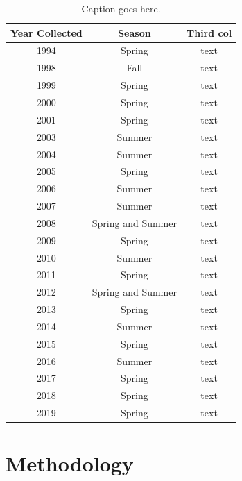 \documentclass[acmtog, authorversion]{acmart}
\begin{document}
\begin{table}
    \caption{Caption goes here.}
    \label{tab:avail}
    \begin{tabular}{c|c|c}
        \toprule
        Year Collected & Season & Third col\\
        \midrule
        1994 & Spring & text\\
        1998 & Fall & text\\
        1999 & Spring & text\\
        2000 & Spring & text\\
        2001 & Spring & text\\
        2003 & Summer & text\\
        2004 & Summer & text\\
        2005 & Spring & text\\
        2006 & Summer & text\\
        2007 & Summer & text\\
        2008 & Spring and Summer & text\\
        2009 & Spring & text\\
        2010 & Summer & text\\
        2011 & Spring & text\\
        2012 & Spring and Summer & text\\
        2013 & Spring & text\\
        2014 & Summer & text\\
        2015 & Spring & text\\
        2016 & Summer & text\\
        2017 & Spring & text\\
        2018 & Spring & text\\
        2019 & Spring & text\\
        \bottomrule
    \end{tabular}
\end{table}




\section{Methodology}
\end{document}
